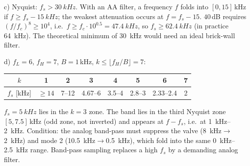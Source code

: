 \begin{solution}
c) Nyquist: $f_s>\SI{30}{kHz}$. With an AA filter, a frequency $f$ folds into
$[0,15]$\,kHz if $f\ge f_s-\SI{15}{kHz}$; the weakest attenuation occurs at
$f=f_s-15$. $40$\,dB requires $(f/f_c)^8\ge10^4$, i.e.\
$f\ge f_c\cdot10^{0.5}=\SI{47.4}{kHz}$, so $f_s\ge\SI{62.4}{kHz}$ (in
practice \SI{64}{kHz}). The theoretical minimum of \SI{30}{kHz} would need an
ideal brick-wall filter.

d) $f_L=6$, $f_H=7$, $B=1$\,kHz, $k\le\lfloor f_H/B\rfloor=7$:
\begin{center}\small
\begin{tabular}{@{}cccccccc@{}}\toprule
$k$ & 1 & 2 & 3 & 4 & 5 & 6 & 7\\\midrule
$f_s$ [kHz] & $\ge14$ & 7--12 & 4.67--6 & 3.5--4 & 2.8--3 & 2.33--2.4 & 2\\\bottomrule
\end{tabular}
\end{center}
$f_s=\SI{5}{kHz}$ lies in the $k=3$ zone. The band lies in the third Nyquist
zone $[5,7.5]$\,kHz (odd zone, not inverted) and appears at $f-f_s$, i.e.\ at
\SIrange{1}{2}{kHz}. Condition: the analog band-pass must suppress the valve
(\SI{8}{kHz}$\to$\SI{2}{kHz}) and mode 2 (\SI{10.5}{kHz}$\to$\SI{0.5}{kHz}),
which fold into the same \SIrange{0}{2.5}{kHz} range. Band-pass sampling
replaces a high $f_s$ by a demanding analog filter.
\end{solution}

